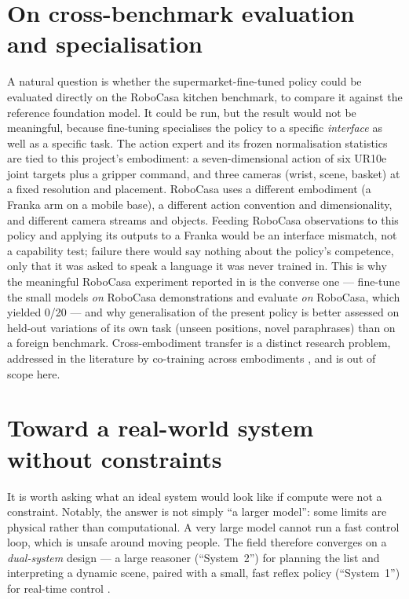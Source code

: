 \section{On cross-benchmark evaluation and specialisation}
\label{sec:disc-crosseval}
A natural question is whether the supermarket-fine-tuned policy could be evaluated
directly on the RoboCasa kitchen benchmark, to compare it against the reference
foundation model. It could be run, but the result would not be meaningful, because
fine-tuning specialises the policy to a specific \emph{interface} as well as a
specific task. The action expert and its frozen normalisation statistics are tied to
this project's embodiment: a seven-dimensional action of six UR10e joint targets
plus a gripper command, and three cameras (wrist, scene, basket) at a fixed
resolution and placement. RoboCasa uses a different embodiment (a Franka arm on a
mobile base), a different action convention and dimensionality, and different camera
streams and objects. Feeding RoboCasa observations to this policy and applying its
outputs to a Franka would be an interface mismatch, not a capability test; failure
there would say nothing about the policy's competence, only that it was asked to
speak a language it was never trained in. This is why the meaningful RoboCasa
experiment reported in  is the converse one --- fine-tune
the small models \emph{on} RoboCasa demonstrations and evaluate \emph{on} RoboCasa,
which yielded 0/20 --- and why generalisation of the present policy is better assessed
on held-out variations of its own task (unseen positions, novel paraphrases) than on
a foreign benchmark. Cross-embodiment transfer is a distinct research problem,
addressed in the literature by co-training across embodiments
\parencite{black2025pi05}, and is out of scope here.

\section{Toward a real-world system without constraints}
\label{sec:disc-ideal}
It is worth asking what an ideal system would look like if compute were not a
constraint. Notably, the answer is not simply ``a larger model'': some limits are
physical rather than computational. A very large model cannot run a fast control
loop, which is unsafe around moving people. The field therefore converges on a
\emph{dual-system} design --- a large reasoner (``System~2'') for planning the list
and interpreting a dynamic scene, paired with a small, fast reflex policy
(``System~1'') for real-time control \parencite{nvidia2025gr00t, black2025pi05}.


